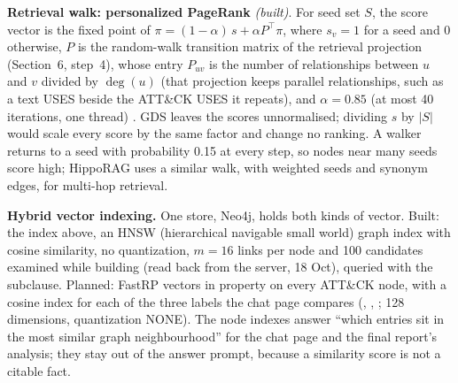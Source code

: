 \documentclass[10pt]{article}
\begin{document}
\textbf{Retrieval walk: personalized PageRank} \emph{(built)}. For seed set $S$, the score vector is the fixed point of $\pi = (1-\alpha)\,s + \alpha P^{\top}\pi$, where $s_v = 1$ for a seed and 0 otherwise, $P$ is the random-walk transition matrix of the retrieval projection (Section~6, step~4), whose entry $P_{uv}$ is the number of relationships between $u$ and $v$ divided by $\deg(u)$ (that projection keeps parallel relationships, such as a text USES beside the ATT\&CK USES it repeats), and $\alpha = 0.85$ (at most 40 iterations, one thread) \cite{3}. GDS leaves the scores unnormalised; dividing $s$ by $|S|$ would scale every score by the same factor and change no ranking. A walker returns to a seed with probability 0.15 at every step, so nodes near many seeds score high; HippoRAG \cite{2} uses a similar walk, with weighted seeds and synonym edges, for multi-hop retrieval.

\textbf{Hybrid vector indexing.} One store, Neo4j, holds both kinds of vector. Built: the  index above, an HNSW (hierarchical navigable small world) graph index \cite{6} with cosine similarity, no quantization, $m{=}16$ links per node and  100 candidates examined while building (read back from the server, 18 Oct), queried with the  subclause. Planned: FastRP vectors in property  on every ATT\&CK node, with a cosine index for each of the three labels the chat page compares (, , ; 128 dimensions, quantization NONE). The node indexes answer ``which entries sit in the most similar graph neighbourhood'' for the chat page and the final report's analysis; they stay out of the answer prompt, because a similarity score is not a citable fact.
\end{document}
